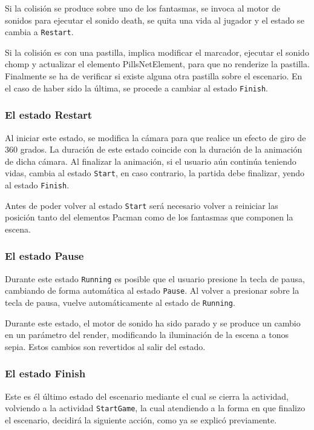 Si la colisión se produce sobre uno de los fantasmas, se  invoca al motor de sonidos para ejecutar el sonido death, se quita una vida al jugador y el estado se cambia a \texttt{Restart}. 
\newline

Si la colisión es con una pastilla, implica modificar el marcador, ejecutar el sonido chomp y actualizar el elemento PillsNetElement, para que no renderize la pastilla. 
\newline
Finalmente se ha de verificar si existe alguna otra pastilla sobre el escenario. En el caso de haber sido la última, se procede a cambiar al estado \texttt{Finish}.




\subsubsection{El estado Restart}
Al iniciar este estado, se modifica la cámara para que realice un efecto de giro de 360 grados. La duración de este estado coincide con la duración de la animación de dicha cámara. Al finalizar la animación, si el usuario aún continúa teniendo vidas, cambia al estado \texttt{Start}, en caso contrario, la partida debe finalizar, yendo al estado \texttt{Finish}.
\newline

Antes de poder volver al estado \texttt{Start} será necesario volver a reiniciar las posición tanto del elementos Pacman como de los fantasmas que componen la escena.

\subsubsection{El estado Pause}
Durante este estado \texttt{Running} es posible que el usuario presione la tecla de pausa, cambiando de forma automática al estado \texttt{Pause}. Al volver a presionar sobre la tecla de pausa, vuelve automáticamente al estado de \texttt{Running}. 
\newline

Durante este estado, el motor de sonido ha sido parado y se produce un cambio en un parámetro del render, modificando la iluminación de la escena a tonos sepia. Estos cambios son revertidos al salir del estado.

\subsubsection{El estado Finish}
Este es él último estado del escenario mediante el cual se cierra la actividad, volviendo a la actividad \texttt{StartGame}, la cual atendiendo a la forma en que finalizo el escenario, decidirá la siguiente acción, como ya se explicó previamente.

